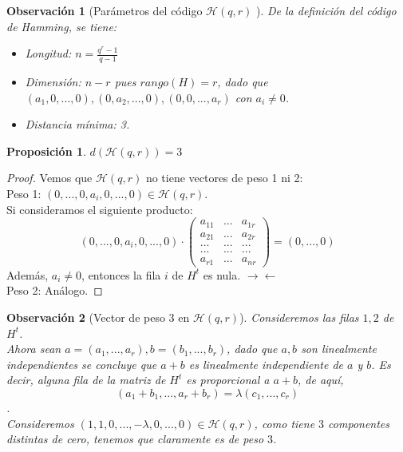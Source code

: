 \documentclass[spanish]{book}
\newtheorem{obsv}{Observación}
\newtheorem{proposi}{Proposición}
\begin{document}
\begin{obsv}[Parámetros del código $\mathcal{H}(q, r)$ ]
	De la definición del código de Hamming, se tiene:
	\begin{itemize}
		\item Longitud: $\displaystyle n=\frac{q^r-1}{q-1}$
		\item Dimensión: $n-r$ pues $rango(H)=r$, dado que $(a_1, 0, ..., 0), (0, a_2, ..., 0), (0, 0, ..., a_r)$ con $a_i \neq 0$.
		\item Distancia mínima: 3.
	\end{itemize}
\end{obsv}

\begin{proposi}
	$d(\mathcal{H}(q, r))=3$
\end{proposi}
\begin{proof}
	Vemos que $\mathcal{H}(q, r)$ no tiene vectores de peso 1 ni 2: \\
	Peso 1: $(0, ..., 0, a_i, 0, ..., 0) \in \mathcal{H}(q, r)$. \\
	Si consideramos el siguiente producto:
	$$(0, ..., 0, a_i, 0, ..., 0) \cdot \left(
	\begin{array}{ccc}
		a_{11} & ... & a_{1r} \\
		a_{21} & ... & a_{2r} \\
		... &... & ... \\
		... & ... & ... \\
		a_{r1} & ... & a_{nr}
	\end{array} \right)=(0, ..., 0)$$
	Además, $a_i\neq 0$, entonces la fila $i$ de $H^t$ es nula. $\longrightarrow\longleftarrow$ \\
	Peso 2: Análogo.
\end{proof}

\begin{obsv}[Vector de peso $3$ en $\mathcal{H}(q, r)$]
	Consideremos las filas $1, 2$ de $H^t$. \\
	Ahora sean $a=(a_1, ..., a_r), b=(b_1, ..., b_r)$, dado que $a, b$ son linealmente independientes se concluye que $a+b$ es linealmente independiente de $a$ y $b$. Es decir, alguna fila de la matriz de $H^t$ es proporcional a $a+b$, de aquí, 
	$$ (a_1+b_1, ..., a_r+b_r)=\lambda (c_1, ..., c_r)$$. \\
	Consideremos $(1, 1, 0,..., -\lambda, 0, ..., 0) \in \mathcal{H}(q, r)$, como tiene $3$ componentes distintas de cero, tenemos que claramente es de peso $3$.
\end{obsv}
\end{document}
